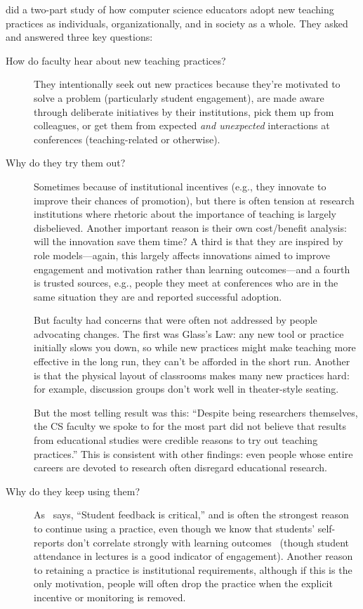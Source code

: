 \cite{Bark2015} did a two-part study of how computer science educators adopt new teaching practices
as individuals, organizationally, and in society as a whole.
They asked and answered three key questions:

\begin{description}

\item[How do faculty hear about new teaching practices?]
  They intentionally seek out new practices
  because they're motivated to solve a problem (particularly student engagement),
  are made aware through deliberate initiatives by their institutions,
  pick them up from colleagues,
  or get them from expected \emph{and unexpected} interactions at conferences
  (teaching-related or otherwise).

\item[Why do they try them out?]
  Sometimes because of institutional incentives
  (e.g., they innovate to improve their chances of promotion),
  but there is often tension at research institutions
  where rhetoric about the importance of teaching is largely disbelieved.
  Another important reason is their own cost/benefit analysis:
  will the innovation save them time?
  A third is that they are inspired by role models---again,
  this largely affects innovations aimed to improve engagement and motivation
  rather than learning outcomes---and a fourth is trusted sources,
  e.g.,
  people they meet at conferences who are in the same situation they are
  and reported successful adoption.

  But faculty had concerns that were often not addressed by people advocating changes.
  The first was Glass's Law:
  any new tool or practice initially slows you down,
  so while new practices might make teaching more effective in the long run,
  they can't be afforded in the short run.
  Another is that the physical layout of classrooms makes many new practices hard:
  for example,
  discussion groups don't work well in theater-style seating.

  But the most telling result was this:
  ``Despite being researchers themselves,
  the CS faculty we spoke to for the most part did not believe that
  results from educational studies were credible reasons to try out teaching practices.''
  This is consistent with other findings:
  even people whose entire careers are devoted to research often disregard educational research.

\item[Why do they keep using them?]
  As~\cite{Bark2015} says, ``Student feedback is critical,''
  and is often the strongest reason to continue using a practice,
  even though we know that students' self-reports don't correlate strongly with learning outcomes~\cite{Star2014,Uttl2017}
  (though student attendance in lectures is a good indicator of engagement).
  Another reason to retaining a practice is institutional requirements,
  although if this is the only motivation,
  people will often drop the practice
  when the explicit incentive or monitoring is removed.

\end{description}

